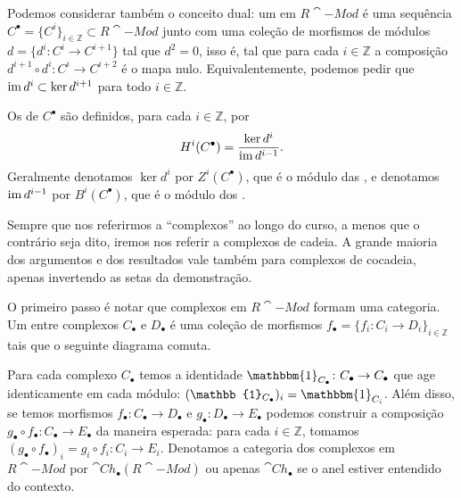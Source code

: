 Podemos considerar também o conceito dual: um  em $R\cat{-Mod}$ é uma sequência $C^\bullet = \{C^i\}_{i \in \mathbb{Z}} \subset R\cat{-Mod}$ junto com uma coleção de morfismos de módulos $d = \{d^i \colon C^i \to C^{i + 1}\}$ tal que $d^2 = 0$, isso é, tal que para cada $i \in \mathbb{Z}$ a composição $d^{i + 1} \circ d^i \colon C^i \to C^{i + 2}$ é o mapa nulo. Equivalentemente, podemos pedir que $\operatorname{im} d^i \subset \ker d^{i + 1}$ para todo $i \in \mathbb{Z}$.

Os  de $C^\bullet$ são definidos, para cada $i \in \mathbb{Z}$, por \begin{equation}
    H^i(C^\bullet) = \frac{\ker d^i}{\operatorname{im} d^{i - 1}}.
\end{equation} Geralmente denotamos $\ker d^i$ por $Z^i(C^\bullet)$, que é o módulo das , e denotamos $\operatorname{im} d^{i-1}$ por $B^i(C^\bullet)$, que é o módulo dos .

Sempre que nos referirmos a ``complexos'' ao longo do curso, a menos que o contrário seja dito, iremos nos referir a complexos de cadeia. A grande maioria dos argumentos e dos resultados vale também para complexos de cocadeia, apenas invertendo as setas da demonstração.

O primeiro passo é notar que complexos em $R\cat{-Mod}$ formam uma categoria. Um  entre complexos $C_\bullet$ e $D_\bullet$ é uma coleção de morfismos $f_\bullet = \{f_i \colon C_i \to D_i\}_{i \in \mathbb{Z}}$ tais que o seguinte diagrama comuta.

\begin{center}
\end{center}

Para cada complexo $C_\bullet$ temos a identidade $\mathbbm{1}_{C_\bullet} \colon C_\bullet \to C_\bullet$ que age identicamente em cada módulo: $(\mathbb{1}_{C_\bullet})_i = \mathbbm{1}_{C_i}$. Além disso, se temos morfismos $f_\bullet \colon C_\bullet \to D_\bullet$ e $g_\bullet \colon D_\bullet \to E_\bullet$ podemos construir a composição $g_\bullet \circ f_\bullet \colon C_\bullet \to E_\bullet$ da maneira esperada: para cada $i \in \mathbb{Z}$, tomamos $(g_\bullet \circ f_\bullet)_i = g_i \circ f_i \colon C_i \to E_i$. Denotamos a categoria dos complexos em $R\cat{-Mod}$ por $\cat{Ch}_\bullet(R\cat{-Mod})$ ou apenas $\cat{Ch}_\bullet$ se o anel estiver entendido do contexto.